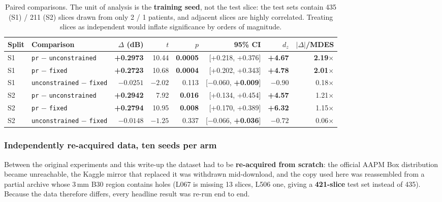 \documentclass[conference]{IEEEtran}
\begin{document}
\begin{table}[t]
\centering
\caption{Paired comparisons. The unit of analysis is the \textbf{training seed},
not the test slice: the test sets contain 435 (S1) / 211 (S2) slices drawn from
only 2 / 1 patients, and adjacent slices are highly correlated. Treating slices
as independent would inflate significance by orders of magnitude.}
\label{tab:paired}
\small
\begin{tabular}{@{}llrrrrrr@{}}
\toprule
Split & Comparison & $\Delta$ (dB) & $t$ & $p$ & 95\% CI & $d_z$ & $|\Delta|$/MDES\\
\midrule
S1 & \texttt{pr} $-$ \texttt{unconstrained} & \textbf{+0.2973} & 10.44 & \textbf{0.0005} & [+0.218, +0.376] & \textbf{+4.67} & \textbf{2.19}$\times$\\
S1 & \texttt{pr} $-$ \texttt{fixed} & \textbf{+0.2723} & 10.68 & \textbf{0.0004} & [+0.202, +0.343] & \textbf{+4.78} & \textbf{2.01}$\times$\\
S1 & \texttt{unconstrained} $-$ \texttt{fixed} & $-0.0251$ & $-2.02$ & 0.113 & [$-0.060$, \textbf{+0.009}] & $-0.90$ & 0.18$\times$\\
\midrule
S2 & \texttt{pr} $-$ \texttt{unconstrained} & \textbf{+0.2942} & 7.92 & \textbf{0.016} & [+0.134, +0.454] & \textbf{+4.57} & 1.21$\times$\\
S2 & \texttt{pr} $-$ \texttt{fixed} & \textbf{+0.2794} & 10.95 & \textbf{0.008} & [+0.170, +0.389] & \textbf{+6.32} & 1.15$\times$\\
S2 & \texttt{unconstrained} $-$ \texttt{fixed} & $-0.0148$ & $-1.25$ & 0.337 & [$-0.066$, \textbf{+0.036}] & $-0.72$ & 0.06$\times$\\
\bottomrule
\end{tabular}
\end{table}

\subsubsection{Independently re-acquired data, ten seeds per arm}
\label{sec:replication}

Between the original experiments and this write-up the dataset had to be
\textbf{re-acquired from scratch}: the official AAPM Box distribution became
unreachable, the Kaggle mirror that replaced it was withdrawn mid-download, and
the copy used here was reassembled from a partial archive whose 3\,mm B30 region
contains holes (L067 is missing 13 slices, L506 one, giving a \textbf{421-slice}
test set instead of 435). Because the data therefore differs, every headline
result was re-run end to end.
\end{document}
